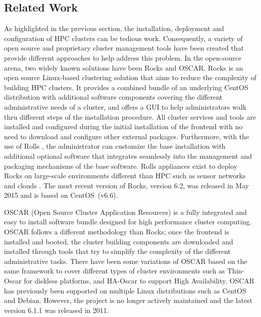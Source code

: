 \subsection{Related Work} \label{sec:related_work}

As highlighted in the previous section, the installation, deployment and
configuration of HPC clusters can be tedious work.  Consequently, a variety of
open source and proprietary cluster management tools have been created that
provide different approaches to help address this problem.  In the open-source
arena, two widely known solutions have been Rocks and OSCAR.  Rocks
\cite{rocks2003,rocks_url} is an open source Linux-based clustering solution
that aims to reduce the complexity of building HPC clusters.  It provides a
combined bundle of an underlying CentOS distribution with additional software
components covering the different administrative needs of a cluster, 
and offers a GUI to help administrators walk thru
different steps of the installation procedure.  All cluster services and tools
are installed and configured during the initial installation of the frontend
with no need to download and %
configure other external
packages. Furthermore, with the use of Rolls \cite{rolls2004}, the
administrator can customize the base installation
with additional
optional software that integrates seamlessly
into the management and
packaging mechanisms of the base software.
Rolls appliances exist to deploy Rocks on large-scale environments different 
than HPC such as sensor networks \cite{rolls_sensors2012} and clouds \cite{rolls_cloud2011}.
The most recent version of Rocks, version 6.2, was released in May 2015 and is
based on CentOS~(v6.6).

OSCAR \cite{oscar2001,oscar_url} (Open Source Cluster Application Resources) is
a fully integrated and easy to install software bundle designed for high
performance cluster computing.
OSCAR follows a different methodology than Rocks; once
the frontend is installed and booted, the cluster building components are
downloaded and installed through tools that try to simplify the complexity of
the different administrative tasks.  There have been some variations of OSCAR
based on the same framework to cover different types of cluster environments
such as Thin-Oscar for diskless platforms, and HA-Oscar to support High
Availability. OSCAR has previously been supported on multiple Linux distributions such as
CentOS and Debian. However,
the project is no longer actively maintained and the latest
version 6.1.1 was released in 2011.

